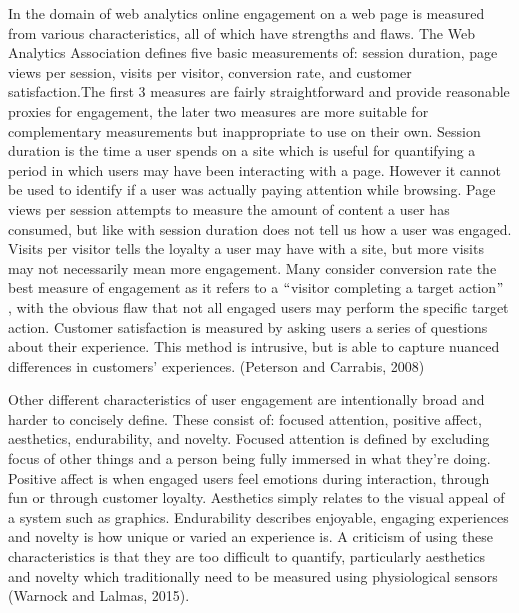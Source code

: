 \documentclass[12pt]{article}
\renewcommand{\_}{\kern-1.5pt\textunderscore\kern-1.5pt}
\begin{document}
\vspace{\baselineskip}
In the domain of web analytics online engagement on a web page is measured from various characteristics, all of which have strengths and flaws. The Web Analytics Association defines five basic measurements of: session duration, page views per session, visits per visitor, conversion rate, and customer satisfaction.The first 3 measures are fairly straightforward and provide reasonable proxies for engagement, the later two measures are more suitable for complementary measurements but inappropriate to use on their own. Session duration is the time a user spends on a site which is useful for quantifying a period in which users may have been interacting with a page. However it cannot be used to identify if a user was actually paying attention while browsing. Page views per session attempts to measure the amount of content a user has consumed, but like with session duration does not tell us how a user was engaged. Visits per visitor tells the loyalty a user may have with a site, but more visits may not necessarily mean more engagement. Many consider conversion rate the best measure of engagement as it refers to a $``$visitor completing a target action$"$ , with the obvious flaw that not all engaged users may perform the specific target action. Customer satisfaction is measured by asking users a series of questions about their experience. This method is intrusive, but is able to capture nuanced differences in customers' experiences. (Peterson and Carrabis, 2008)\par


\vspace{\baselineskip}
Other different characteristics of user engagement are intentionally broad and harder to concisely define. These consist of: focused attention, positive affect, aesthetics, endurability, and novelty. Focused attention is defined by excluding focus of other things and a person being fully immersed in what they're doing. Positive affect is when engaged users feel emotions during interaction, through fun or through customer loyalty. Aesthetics simply relates to the visual appeal of a system such as graphics. Endurability describes enjoyable, engaging experiences and novelty is how unique or varied an experience is. A criticism of using these characteristics is that they are too difficult to quantify, particularly aesthetics and novelty which traditionally need to be measured using physiological sensors (Warnock and Lalmas, 2015).\par
\end{document}
